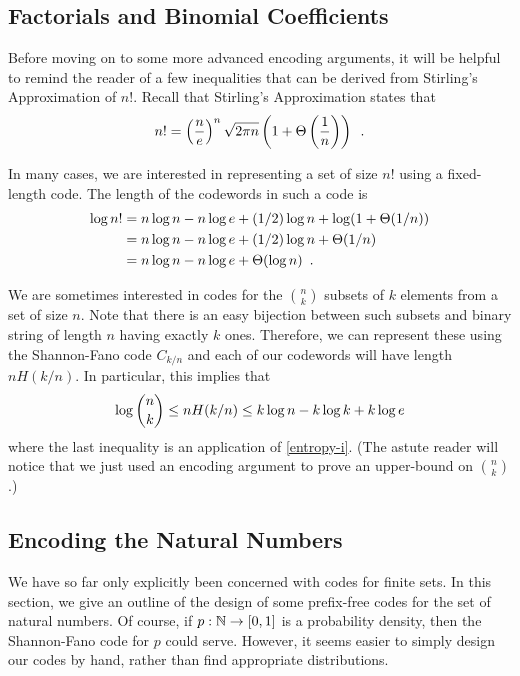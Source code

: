 \documentclass{patmorin}
\begin{document}
\subsection{Factorials and Binomial Coefficients}

Before moving on to some more advanced encoding arguments, it will be
helpful to remind the reader of a few inequalities that can be derived
from Stirling's Approximation of $n!$.  Recall that Stirling's
Approximation states that
\begin{equation}
  n! = \left(\frac{n}{e}\right)^n\sqrt{2\pi n}\left(1+\Theta\left(\frac{1}{n}\right)\right) \enspace .
  \eqlabel{stirling}
\end{equation}

In many cases, we are interested in representing a set of size $n!$
using a fixed-length code.  The length of the codewords in such a code
is
\begin{align}
  \log n!
  & = n\log n - n\log e + (1/2)\log n + \log(1+\Theta(1/n)) \notag \\
  & = n\log n - n\log e + (1/2)\log n + \Theta(1/n) \notag \\
  & = n\log n - n\log e + \Theta(\log n) \eqlabel{stirling-loose}
    \enspace .
\end{align}

We are sometimes interested in codes for the $\binom{n}{k}$ subsets of
$k$ elements from a set of size $n$.  Note that there is an easy
bijection between such subsets and binary string of length $n$ having
exactly $k$ ones. Therefore, we can represent these using the
Shannon-Fano code $C_{k/n}$ and each of our codewords will have length
$nH(k/n)$.  In particular, this implies that
\begin{equation}
  \log\binom{n}{k} \le nH(k/n) \le k\log n - k\log k + k\log e 
  \eqlabel{log-n-choose-k}
\end{equation}
where the last inequality is an application of \eqref{entropy-i}. (The
astute reader will notice that we just used an encoding argument to
prove an upper-bound on $\binom{n}{k}$.)

\subsection{Encoding the Natural Numbers}

We have so far only explicitly been concerned with codes for finite
sets. In this section, we give an outline of the design of some
prefix-free codes for the set of natural numbers. Of course, if $p :
\mathbb{N} \to [0, 1]$ is a probability density, then the Shannon-Fano code
for $p$ could serve. However, it seems easier to simply design our
codes by hand, rather than find appropriate distributions.
\end{document}
